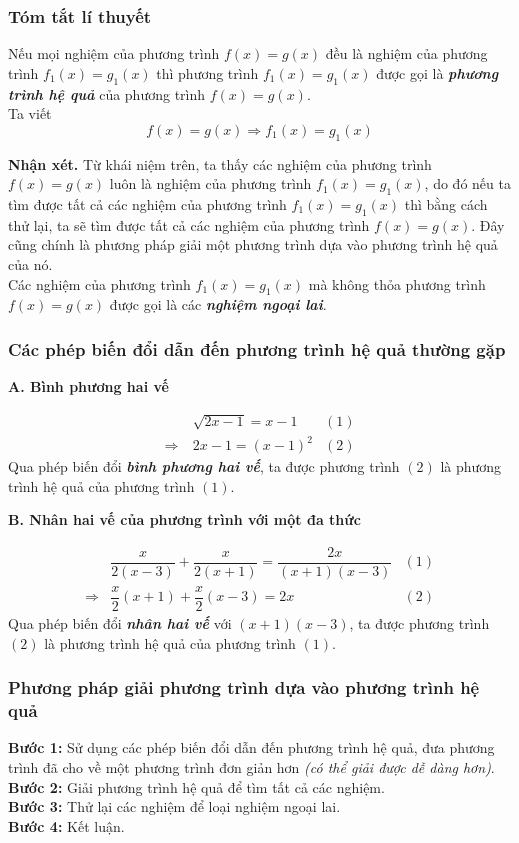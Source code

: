 \subsubsection{Tóm tắt lí thuyết}
\begin{kn}
	Nếu mọi nghiệm của phương trình $f(x)=g(x)$ đều là nghiệm của phương trình $f_1(x)=g_1(x)$ thì phương trình $f_1(x)=g_1(x)$ được gọi là \textbf{\textit{phương trình hệ quả}} của phương trình $f(x)=g(x)$.\\
	Ta viết
	$$f(x)=g(x)\Rightarrow f_1(x)=g_1(x)$$
\end{kn}
\textbf{Nhận xét.} Từ khái niệm trên, ta thấy các nghiệm của phương trình $f(x)=g(x)$ luôn là nghiệm của phương trình $f_1(x)=g_1(x)$, do đó nếu ta tìm được tất cả các nghiệm của phương trình $f_1(x)=g_1(x)$ thì bằng cách thử lại, ta sẽ tìm được tất cả các nghiệm của phương trình $f(x)=g(x)$. Đây cũng chính là phương pháp giải một phương trình dựa vào phương trình hệ quả của nó.\\
Các nghiệm của phương trình $f_1(x)=g_1(x)$ mà không thỏa phương trình $f(x)=g(x)$ được gọi là các \textbf{\textit{nghiệm ngoại lai}}.
\subsubsection{Các phép biến đổi dẫn đến phương trình hệ quả thường gặp}
\textbf{A. Bình phương hai vế}
\begin{vd}
	\begin{align*}
	& \sqrt{2x-1}=x-1 & (1) \\
	\Rightarrow\ &2x-1=(x-1)^2& (2)
	\end{align*}
	Qua phép biến đổi \textbf{\textit{bình phương hai vế}}, ta được phương trình $(2)$ là phương trình hệ quả của phương trình $(1)$.
\end{vd}
\textbf{B. Nhân hai vế của phương trình với một đa thức}
\begin{vd}
	\begin{align*}
	& \dfrac{x}{2(x-3)}+\dfrac{x}{2(x+1)}=\dfrac{2x}{(x+1)(x-3)} & (1) \\
	\Rightarrow &\dfrac{x}{2}(x+1)+\dfrac{x}{2}(x-3)=2x& (2)
	\end{align*}
	Qua phép biến đổi \textbf{\textit{nhân hai vế}} với $(x+1)(x-3)$, ta được phương trình $(2)$ là phương trình hệ quả của phương trình $(1)$.
\end{vd}
\subsubsection{Phương pháp giải phương trình dựa vào phương trình hệ quả}
\textbf{Bước 1:} Sử dụng các phép biến đổi dẫn đến phương trình hệ quả, đưa phương trình đã cho về một phương trình đơn giản hơn \textit{(có thể giải được dễ dàng hơn)}.\\
\textbf{Bước 2:} Giải phương trình hệ quả để tìm tất cả các nghiệm.\\
\textbf{Bước 3:} Thử lại các nghiệm để loại nghiệm ngoại lai.\\
\textbf{Bước 4:} Kết luận.

